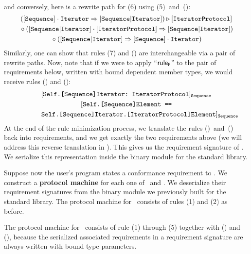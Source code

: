 \documentclass[../generics]{subfiles}
\begin{document}
\begin{example}
\begin{gather*}
\end{gather*}
and conversely, here is a rewrite path for (6) using (5)~and~():
\begin{gather*}
([\texttt{Sequence}]\cdot\texttt{Iterator} \Rightarrow [\texttt{Sequence}|\texttt{Iterator}]) \triangleright [\texttt{IteratorProtocol}]\\
{} \circ ([\texttt{Sequence}|\texttt{Iterator}]\cdot[\texttt{IteratorProtocol}] \Rightarrow [\texttt{Sequence}|\texttt{Iterator}])\\
{} \circ ([\texttt{Sequence}|\texttt{Iterator}] \Rightarrow [\texttt{Sequence}]\cdot\texttt{Iterator})
\end{gather*}
Similarly, one can show that rules (7) and () are interchangeable via a pair of rewrite paths. Now, note that if we were to apply ``$\mathsf{rule}_{\texttt{P}}$'' to the pair of requirements below, written with bound dependent member types, we would receive rules () and ():
\begin{gather*}
[\texttt{Self.[Sequence]Iterator:~IteratorProtocol}]_{\texttt{Sequence}}\\
[\texttt{Self.[Sequence]Element ==}\\
\qquad\qquad\texttt{Self.[Sequence]Iterator.[IteratorProtocol]Element}]_{\texttt{Sequence}}
\end{gather*}
At the end of the rule minimization process, we translate the rules ()~and~() back into requirements, and we get exactly the two requirements above (we will address this reverse translation in ). This gives us the requirement signature of \tSequence. We serialize this representation inside the binary module for the standard library.
\end{example}

\begin{example}
Suppose now the user's program states a conformance requirement to \tSequence. We construct a \textbf{protocol machine} for each one of \tIterator\ and \tSequence. We deserialize their requirement signatures from the binary module we previously built for the standard library. The protocol machine for \tIterator\ consists of rules (1) and (2) as before.

The protocol machine for \tSequence\ consists of rule (1) through (5) together with () and (), because the serialized associated requirements in a requirement signature are always written with bound type parameters.
\end{example}
\end{document}
